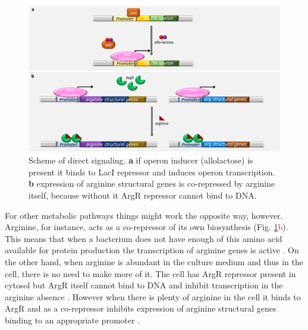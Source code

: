 \begin{figure}[ht]
  \centering
  \includegraphics[scale=0.27]{text/Pictures/DirectSignaling.png}
	\caption{Scheme of direct signaling. \textbf{a} if  operon inducer (allolactose) is present it binds to LacI repressor and induces  operon transcription. \textbf{b} expression of arginine structural genes is co-repressed by arginine itself, because without it ArgR repressor cannot bind to DNA.}
	\label{dir}
\end{figure}

For other metabolic pathways things might work the opposite way, however.
Arginine, for instance, acts as a co-repressor of its own biosynthesis (Fig. \ref{dir}\textcolor{red}{b}).
This means that when a bacterium does not have enough of this amino acid available for protein production the transcription of arginine genes is active \cite{charlier2004biosynthesis, caldara2006arginine}.
On the other hand, when arginine is abundant in the culture medium and thus in the cell, there is no need to make more of it.
The cell has ArgR repressor present in cytosol but ArgR itself cannot bind to DNA and inhibit transcription in the arginine absence \cite{clark2005molecular, caldara2006arginine}.
However when there is plenty of arginine in the cell it binds to ArgR and as a co-repressor inhibits expression of arginine structural genes binding to an appropriate promoter \cite{charlier1992arginine, charlier2004biosynthesis, clark2005molecular}.

